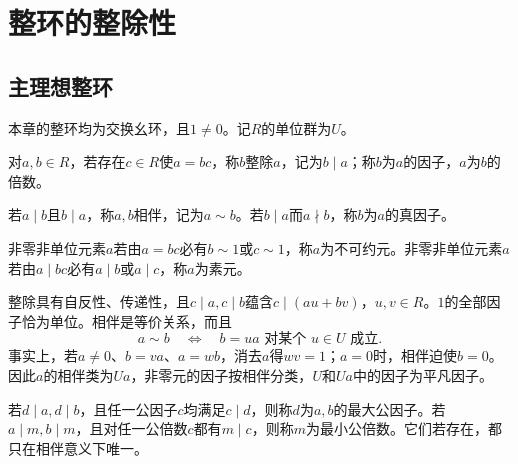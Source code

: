 \setchapterimage{}
\chapter{整环的整除性}\label{p2:ch4}

\section{主理想整环}

本章的整环均为交换幺环，且$1\ne0$。记$R$的单位群为$U$。

\begin{definition}
对$a,b\in R$，若存在$c\in R$使$a=bc$，称$b$整除$a$，记为$b\mid a$；称$b$为$a$的因子，$a$为$b$的倍数。

若$a\mid b$且$b\mid a$，称$a,b$相伴，记为$a\sim b$。若$b\mid a$而$a\nmid b$，称$b$为$a$的真因子。

非零非单位元素$a$若由$a=bc$必有$b\sim1$或$c\sim1$，称$a$为不可约元。非零非单位元素$a$若由$a\mid bc$必有$a\mid b$或$a\mid c$，称$a$为素元。
\end{definition}

整除具有自反性、传递性，且$c\mid a,c\mid b$蕴含$c\mid(au+bv)$，$u,v\in R$。$1$的全部因子恰为单位。相伴是等价关系，而且
\[
a\sim b\quad\Longleftrightarrow\quad b=ua\text{ 对某个 }u\in U\text{ 成立}.
\]
事实上，若$a\ne0$、$b=va$、$a=wb$，消去$a$得$wv=1$；$a=0$时，相伴迫使$b=0$。因此$a$的相伴类为$Ua$，非零元的因子按相伴分类，$U$和$Ua$中的因子为平凡因子。

\begin{definition}
若$d\mid a,d\mid b$，且任一公因子$c$均满足$c\mid d$，则称$d$为$a,b$的最大公因子。若$a\mid m,b\mid m$，且对任一公倍数$c$都有$m\mid c$，则称$m$为最小公倍数。它们若存在，都只在相伴意义下唯一。
\end{definition}

